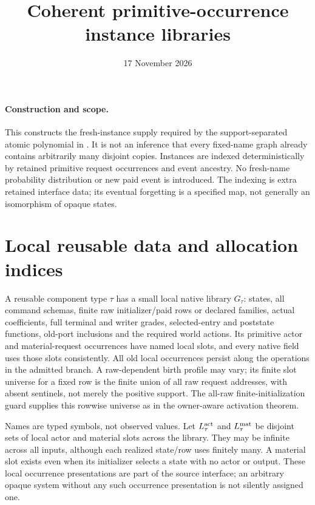 \documentclass[11pt]{article}
\title{Coherent primitive-occurrence instance libraries}
\date{17 November 2026}
\begin{document}
\maketitle
\paragraph{Construction and scope.}
This constructs the fresh-instance supply required by the support-separated atomic polynomial in \texttt{}. It is not an inference that every fixed-name graph already contains arbitrarily many disjoint copies. Instances are indexed deterministically by retained primitive request occurrences and event ancestry. No fresh-name probability distribution or new paid event is introduced. The indexing is extra retained interface data; its eventual forgetting is a specified map, not generally an isomorphism of opaque states.

\section{Local reusable data and allocation indices}
A reusable component type $\tau$ has a small local native library $G_\tau$: states, all command schemas, finite raw initializer/paid rows or declared families, actual coefficients, full terminal and writer grades, selected-entry and poststate functions, old-port inclusions and the required world actions. Its primitive actor and material-request occurrences have named local slots, and every native field uses those slots consistently. All old local occurrences persist along the operations in the admitted branch. A raw-dependent birth profile may vary; its finite slot universe for a fixed row is the finite union of all raw request addresses, with absent sentinels, not merely the positive support. The all-raw finite-initialization guard supplies this rowwise universe as in the owner-aware activation theorem.

Names are typed symbols, not observed values. Let $L_\tau^{\rm act}$ and $L_\tau^{\rm mat}$ be disjoint sets of local actor and material slots across the library. They may be infinite across all inputs, although each realized state/row uses finitely many. A material slot exists even when its initializer selects a state with no actor or output. These local occurrence presentations are part of the source interface; an arbitrary opaque system without any such occurrence presentation is not silently assigned one.
\end{document}
